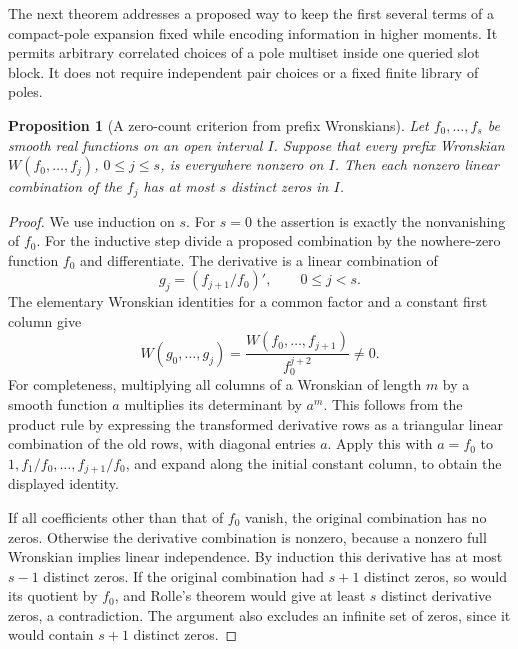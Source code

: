 \documentclass[11pt]{article}
\newtheorem{proposition}[theorem]{Proposition}
\begin{document}
The next theorem addresses a proposed way to keep the first several
terms of a compact-pole expansion fixed while encoding information in
higher moments. It permits arbitrary correlated choices of a pole
multiset inside one queried slot block. It does not require independent
pair choices or a fixed finite library of poles.

\begin{proposition}[A zero-count criterion from prefix Wronskians]
Let $f_0,\ldots,f_s$ be smooth real functions on an open interval $I$.
Suppose that every prefix Wronskian
$W(f_0,\ldots,f_j)$, $0\leq j\leq s$, is everywhere nonzero on $I$.
Then each nonzero linear combination of the $f_j$ has at most $s$
distinct zeros in $I$.
\end{proposition}
\begin{proof}
We use induction on $s$. For $s=0$ the assertion is exactly the
nonvanishing of $f_0$. For the inductive step divide a proposed
combination by the nowhere-zero function $f_0$ and differentiate.
The derivative is a linear combination of
\[
 g_j=(f_{j+1}/f_0)',\qquad 0\leq j<s.
\]
The elementary Wronskian identities for a common factor and a constant
first column give
\[
 W(g_0,\ldots,g_j)
 =\frac{W(f_0,\ldots,f_{j+1})}{f_0^{j+2}}\ne0.
\]
For completeness, multiplying all columns of a Wronskian of length
$m$ by a smooth function $a$ multiplies its determinant by $a^m$.
This follows from the product rule by expressing the transformed
derivative rows as a triangular linear combination of the old rows,
with diagonal entries $a$. Apply this with $a=f_0$ to
$1,f_1/f_0,\ldots,f_{j+1}/f_0$, and expand along the initial
constant column, to obtain the displayed identity.

If all coefficients other than that of $f_0$ vanish, the original
combination has no zeros. Otherwise the derivative combination is
nonzero, because a nonzero full Wronskian implies linear independence.
By induction this derivative has at most $s-1$ distinct zeros. If the
original combination had $s+1$ distinct zeros, so would its quotient
by $f_0$, and Rolle's theorem would give at least $s$ distinct derivative
zeros, a contradiction. The argument also excludes an infinite set of
zeros, since it would contain $s+1$ distinct zeros.
\end{proof}
\end{document}
